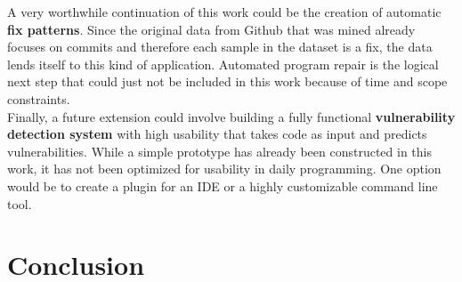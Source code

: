 \documentclass[
	a4paper,
	pagesize,
	pdftex,
	12pt,
	twoside, %
	BCOR=5mm, %
	ngerman,
	fleqn,
	final,
	]{scrartcl}
\begin{document}
A very worthwhile continuation of this work could be the creation of automatic \textbf{fix patterns}. Since the original data from Github that was mined already focuses on commits and therefore each sample in the dataset is a fix, the data lends itself to this kind of application. Automated program repair is the logical next step that could just not be included in this work because of time and scope constraints.\\
Finally, a future extension could involve building a fully functional \textbf{vulnerability detection system} with high usability that takes code as input and predicts vulnerabilities. While a simple prototype has already been constructed in this work, it has not been optimized for usability in daily programming. One option would be to create a plugin for an IDE or a highly customizable command line tool.








\newpage
\section{Conclusion}
\end{document}
